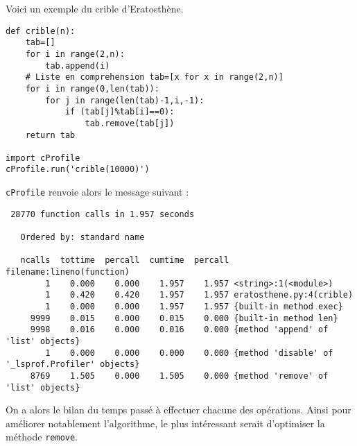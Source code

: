 \begin{exemple}

Voici un exemple du crible d'Eratosthène.

\begin{lstlisting}
def crible(n):
    tab=[] 
    for i in range(2,n):
        tab.append(i)
    # Liste en comprehension tab=[x for x in range(2,n)]
    for i in range(0,len(tab)):
        for j in range(len(tab)-1,i,-1):
            if (tab[j]%tab[i]==0):
                tab.remove(tab[j])
    return tab
    
import cProfile            
cProfile.run('crible(10000)')

\end{lstlisting}

\texttt{cProfile} renvoie alors le message suivant :


\begin{lstlisting}
 28770 function calls in 1.957 seconds

   Ordered by: standard name

   ncalls  tottime  percall  cumtime  percall filename:lineno(function)
        1    0.000    0.000    1.957    1.957 <string>:1(<module>)
        1    0.420    0.420    1.957    1.957 eratosthene.py:4(crible)
        1    0.000    0.000    1.957    1.957 {built-in method exec}
     9999    0.015    0.000    0.015    0.000 {built-in method len}
     9998    0.016    0.000    0.016    0.000 {method 'append' of 'list' objects}
        1    0.000    0.000    0.000    0.000 {method 'disable' of '_lsprof.Profiler' objects}
     8769    1.505    0.000    1.505    0.000 {method 'remove' of 'list' objects}

\end{lstlisting}


On a alors le bilan du temps passé à effectuer chacune des opérations. Ainsi pour améliorer notablement l'algorithme, le plus intéressant serait d'optimiser la méthode \texttt{remove}.
\end{exemple}




\begin{thebibliography}{2}
\end{thebibliography}